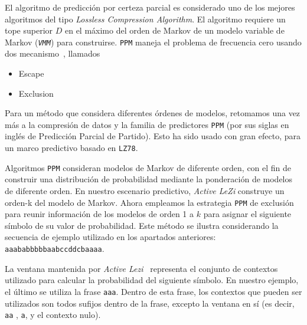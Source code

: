 El algoritmo de predicción por certeza parcial es considerado uno de los mejores algoritmos del tipo \emph{Lossless Compression Algorithm}. El algoritmo requiere un tope superior $D$ en el máximo del orden de Markov de un modelo variable de Markov (\emph{\texttt{VMM}}) para construirse. 
\texttt{PPM} maneja el problema de frecuencia cero usando dos mecanismo~\cite{Begleiter2004},  llamados
	
	\begin{itemize}
			\setlength{\itemsep}{1pt}
			\setlength{\parskip}{0pt}
			\setlength{\parsep}{0pt}
		\item Escape
		\item Exclusion
	\end{itemize}
	
Para un método que considera diferentes órdenes de modelos, retomamos una vez más a la compresión de datos y la familia de predictores \texttt{PPM}  (por sus siglas en inglés de Predicción Parcial de Partido). Esto ha sido usado con gran efecto, para un marco predictivo basado en \texttt{LZ78}. 

Algoritmos  \texttt{PPM} consideran modelos de Markov de diferente orden,  con el fin de construir una distribución de probabilidad mediante la ponderación de modelos de diferente orden. En nuestro escenario predictivo, \emph{Active LeZi} construye un orden-k del modelo de Markov. Ahora empleamos la estrategia \texttt{PPM} de exclusión para reunir información de los modelos de orden 1 a $k$ para asignar el siguiente símbolo de su valor de probabilidad. Este método se ilustra considerando la secuencia de ejemplo utilizado en los apartados anteriores: \texttt{aaababbbbbaabccddcbaaaa}.

La ventana mantenida por \emph{Active Lezi}~\cite{Gopalratnam2007} representa el conjunto de contextos utilizado para calcular la probabilidad  del siguiente símbolo. En nuestro ejemplo, el último se utiliza la frase \texttt{aaa}. Dentro de esta frase, los contextos que pueden ser utilizados son todos sufijos dentro de la frase, excepto la ventana en sí (es decir, \texttt{aa} , \texttt{a}, y el contexto nulo).

	

